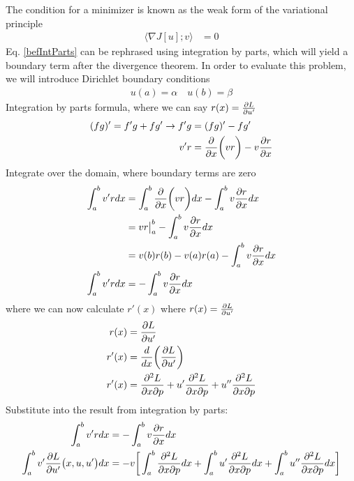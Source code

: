 \documentclass[12pt,3p]{article}
\numberwithin{equation}{section}
\begin{document}
The condition for a minimizer is known as the weak form of the variational principle
\begin{align}\label{wfVarPrin}
\langle \nabla J[u]; v\rangle &= 0
\end{align}
Eq. \ref{befIntParts} can be rephrased using integration by parts, which will yield a boundary term after the divergence theorem. In order to evaluate this problem, we will introduce Dirichlet boundary conditions 
\begin{align}\label{dirBC}
u(a) = \alpha \quad u(b) = \beta
\end{align}
Integration by parts formula, where we can say $r(x) = \pdv{L}{u'}$
\begin{align}\label{intByParts}
\begin{split}
(fg)' = f' g + f g' \rightarrow f' g &= (fg)' - f g' \\
                                v' r &= \pdv{}{x} \bigg(v r \bigg) - v \pdv{r}{x}  
\end{split}
\end{align}
Integrate over the domain, where boundary terms are zero
\begin{align*}
\int_a^b v' r dx &= \int_a^b \pdv{}{x} \bigg(v r \bigg) dx - \int_a^b v \pdv{r}{x} dx \\
                 &= v r \big\rvert_a^b - \int_a^b v \pdv{r}{x} dx \\
                 &= v(b) r(b) - v(a) r(a) - \int_a^b v \pdv{r}{x} dx \\
\int_a^b v' r dx &= - \int_a^b v \pdv{r}{x} dx
\end{align*}
where we can now calculate $r'(x)$ where $r(x) = \pdv{L}{u'}$
\begin{align*}
\begin{split}
r(x) &= \pdv{L}{u'} (x, u, u') \\
r'(x) &= \frac{d}{dx} \bigg(  \pdv{L}{u'} (x, u, u') \bigg) \\
r'(x) &= \pdv[2]{L}{x}{p} (x, u, u') + u' \pdv[2]{L}{x}{p} (x, u, u') + u'' \pdv[2]{L}{x}{p} (x, u, u')
\end{split}
\end{align*}
Substitute into the result from integration by parts: 
\begin{align*}
\int_a^b v' r dx &= - \int_a^b v \pdv{r}{x} dx \\
\int_a^b v' \pdv{L}{u'} \big(x, u, u' \big) dx &= - v \bigg[ \int_a^b \pdv[2]{L}{x}{p} (x, u, u') dx + \int_a^b u' \pdv[2]{L}{x}{p} (x, u, u') dx + \int_a^b u'' \pdv[2]{L}{x}{p} (x, u, u') dx \bigg] 
\end{align*}
\end{document}

